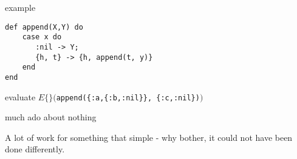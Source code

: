 \begin{frame}[fragile]{example}

\begin{verbatim}
def append(X,Y) do
    case x do
       :nil -> Y; 
       {h, t} -> {h, append(t, y)} 
    end
end
\end{verbatim}

\pause\vspace{20pt}
evaluate $E\lbrace\rbrace( ${\tt append(\{:a,\{:b,:nil\}\}, \{:c,:nil\})}$ )$

\end{frame}


\begin{frame}{much ado about nothing}

A lot of work for something that simple - why bother, it could not have
been done differently.
\end{frame}



